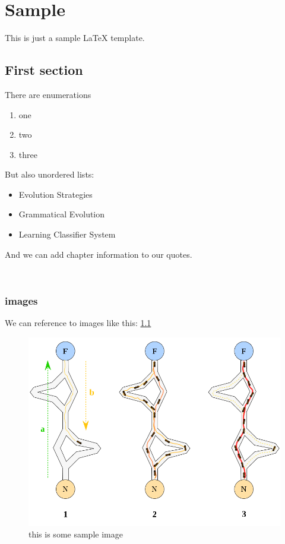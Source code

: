 \chapter{Sample}

This is just a sample LaTeX template. \cite{YB}

\section{First section}

There are enumerations

\begin{enumerate}
    \item one
    \item two
    \item three
\end{enumerate}

But also unordered lists:

\begin{itemize}
    \item Evolution Strategies
    \item Grammatical Evolution
    \item Learning Classifier System
\end{itemize}

And we can add chapter information to our quotes.

\cite[Kap. 1.2]{Bro11} \\

\subsection{images}

We can reference to images like this: \ref{fig:sample}

\begin{figure}[h!]
    \centering
    \includegraphics[scale=0.5]{resources/sample.png}
    \caption{this is some sample image \cite{YB}}
    \label{fig:sample}
\end{figure}

